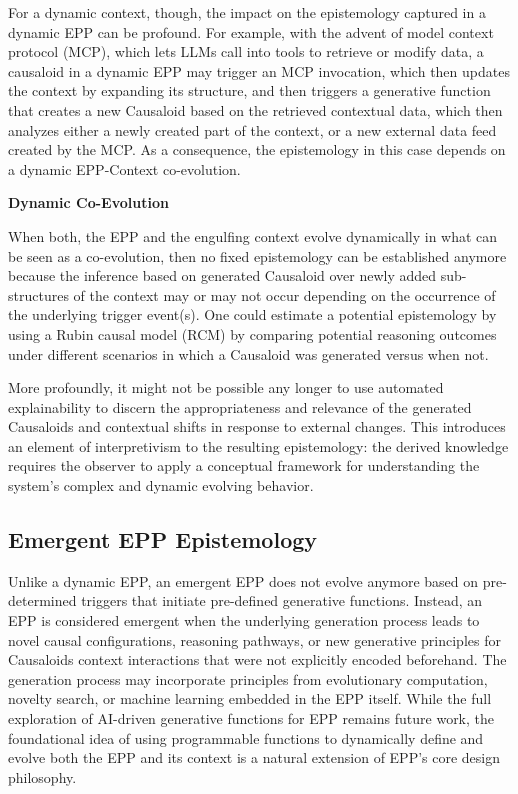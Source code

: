 \documentclass{article}
\begin{document}
For a dynamic context, though, the impact on the epistemology captured in a dynamic EPP can be profound. For example, with the advent of model context protocol (MCP), which lets LLMs call into tools to retrieve or modify data, a causaloid in a dynamic EPP may trigger an MCP invocation, which then updates the context by expanding its structure, and then triggers a generative function that creates a new Causaloid based on the retrieved contextual data, which then analyzes either a newly created part of the context, or a new external data feed created by the MCP. As a consequence, the epistemology in this case depends on a dynamic EPP-Context co-evolution.

\textbf{Dynamic Co-Evolution}

When both, the EPP and the engulfing context evolve dynamically in what can be seen as a co-evolution, then no fixed epistemology can be established anymore because the inference based on generated Causaloid over newly added sub-structures of the context may or may not occur depending on the occurrence of the underlying trigger event(s). One could estimate a potential epistemology by using a Rubin causal model\cite{rubin2005causal} (RCM) by comparing potential reasoning outcomes under different scenarios in which a Causaloid was generated versus when not.

More profoundly, it might not be possible any longer to use automated explainability to discern the appropriateness and relevance of the generated Causaloids and contextual shifts in response to external changes. This introduces an element of interpretivism to the resulting epistemology: the derived knowledge requires the observer to apply a conceptual framework for understanding the system's complex and dynamic evolving behavior.

\subsection{Emergent EPP Epistemology}

Unlike a dynamic EPP, an emergent EPP does not evolve anymore based on pre-determined triggers that initiate pre-defined generative functions. Instead, an EPP is considered emergent when the underlying generation process leads to novel causal configurations, reasoning pathways, or new generative principles for Causaloids context interactions that were not explicitly encoded beforehand.
The generation process may incorporate principles from evolutionary computation, novelty search, or machine learning embedded in the EPP itself. While the full exploration of AI-driven generative functions for EPP remains future work, the foundational idea of using programmable functions to dynamically define and evolve both the EPP and its context is a natural extension of EPP's core design philosophy.
\end{document}
